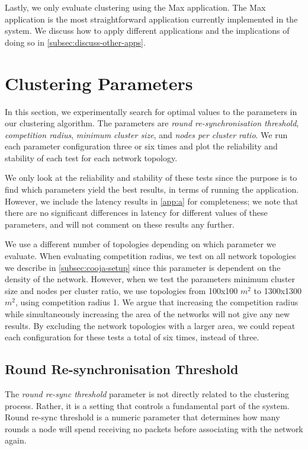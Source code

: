 Lastly, we only evaluate clustering using the Max application. The Max application is the most straightforward application currently implemented in the \atwo{} system. We discuss how to apply different applications and the implications of doing so in \cref{subsec:discuss-other-apps}.


\section{Clustering Parameters}
\label{sec:clustering-parameters}
In this section, we experimentally search for optimal values to the parameters in our clustering algorithm. The parameters are \emph{round re-synchronisation threshold}, \emph{competition radius}, \emph{minimum cluster size}, and \emph{nodes per cluster ratio}. We run each parameter configuration three or six times and plot the reliability and stability of each test for each network topology.

We only look at the reliability and stability of these tests since the purpose is to find which parameters yield the best results, in terms of running the application. However, we include the latency results in \cref{app:a} for completeness; we note that there are no significant differences in latency for different values of these parameters, and will not comment on these results any further.

We use a different number of topologies depending on which parameter we evaluate. When evaluating competition radius, we test on all network topologies we describe in \cref{subsec:cooja-setup} since this parameter is dependent on the density of the network. However, when we test the parameters minimum cluster size and nodes per cluster ratio, we use topologies from 100x100 $m^2$ to 1300x1300 $m^2$, using competition radius 1. We argue that increasing the competition radius while simultaneously increasing the area of the networks will not give any new results. By excluding the network topologies with a larger area, we could repeat each configuration for these tests a total of six times, instead of three.

\subsection{Round Re-synchronisation Threshold}
\label{subsec-resync-threshold}
The \emph{round re-sync threshold} parameter is not directly related to the clustering process. Rather, it is a setting that controls a fundamental part of the \atwo{} system. Round re-sync threshold is a numeric parameter that determines how many rounds a node will spend receiving no packets before associating with the network again. 

